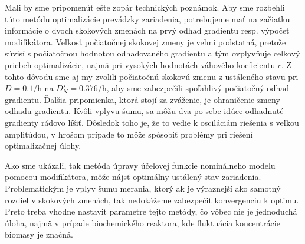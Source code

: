 Mali by sme pripomenúť ešte zopár technických poznámok. Aby sme rozbehli túto metódu optimalizácie prevádzky zariadenia, potrebujeme mať na začiatku informácie o dvoch skokových zmenách na prvý odhad gradientu resp. výpočet modifikátora. Veľkosť počiatočnej skokovej zmeny je veľmi podstatná, pretože súvisí s počiatočnou hodnotou odhadovaného gradientu a tým ovplyvňuje celkový priebeh optimalizácie, najmä pri vysokých hodnotách váhového koeficientu $ c $. Z tohto dôvodu sme aj my zvolili počiatočnú skokovú zmenu z ustáleného stavu pri $ D = 0.1\si{\per\hour} $ na $ D_{N}^{\star} = 0.376\si{\per\hour} $, aby sme zabezpečili spoľahlivý počiatočný odhad gradientu. Ďalšia pripomienka, ktorá stojí za zváženie, je ohraničenie zmeny odhadu gradientu. Kvôli vplyvu šumu, sa môžu dva po sebe idúce odhadnuté gradienty rádovo líšiť. Dôsledok toho je, že to vedie k osciláciám riešenia s veľkou amplitúdou, v hrošom prípade to môže spôsobiť problémy pri riešení optimalizačnej úlohy. 

Ako sme ukázali, tak metóda úpravy účelovej funkcie nominálneho modelu pomocou modifikátora, môže nájsť optimálny ustálený stav zariadenia. Problematickým je vplyv šumu merania, ktorý ak je výraznejší ako samotný rozdiel v skokových zmenách, tak nedokážeme zabezpečiť konvergenciu k optimu. Preto treba vhodne nastaviť parametre tejto metódy, čo vôbec nie je jednoduchá úloha, najmä v prípade biochemického reaktora, kde fluktuácia koncentrácie biomasy je značná.

